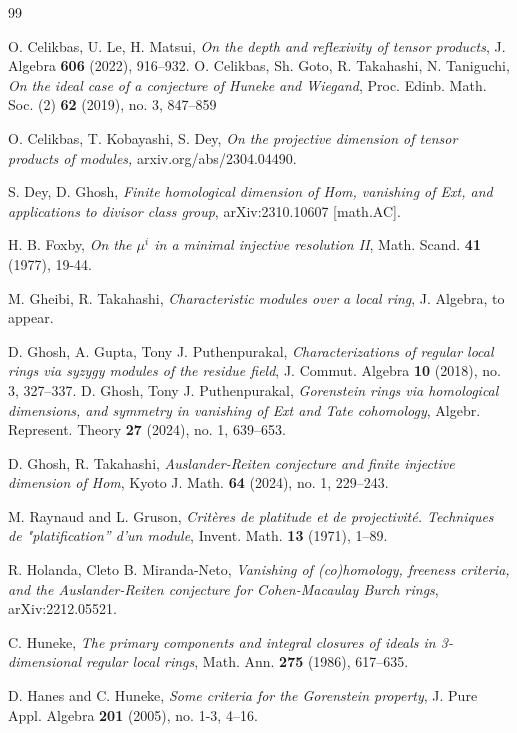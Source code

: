 \documentclass[10. pt,a4paper]{amsart}
\theoremstyle{definition}
\theoremstyle{remark}
\begin{document}
\begin{thebibliography}{99}
 
O.  Celikbas, U. Le, H. Matsui,  \emph{On the depth and reflexivity of tensor products}, J. Algebra  {\bf606} (2022), 916–932.
O. 
Celikbas, Sh. Goto, R. Takahashi, N. Taniguchi, {\it On the ideal case of a conjecture of Huneke and Wiegand}, Proc. Edinb. Math. Soc. (2) {\bf62} (2019), no. 3, 847–859

O. Celikbas, T. Kobayashi, S. Dey, {\it On the projective dimension of tensor products of modules,} arxiv.org/abs/2304.04490.


S. Dey, D. Ghosh, {\it
Finite homological dimension of Hom, vanishing of Ext, and applications to divisor class group},
arXiv:2310.10607 [math.AC].


H. B. Foxby, {\it On the $\mu^i$ in a minimal injective resolution II}, Math. Scand.
{\bf41} (1977), 19-44.

M. Gheibi, R. Takahashi,
{\it   Characteristic modules over a local ring},
J.  Algebra,  to appear.

D. Ghosh, A. Gupta, Tony J. Puthenpurakal,
{\it   Characterizations of regular local rings via syzygy modules of the residue field},
J. Commut. Algebra {\bf10} (2018), no. 3, 327–337.
 D. Ghosh, Tony J. Puthenpurakal,
{\it Gorenstein rings via homological dimensions, and symmetry in vanishing of Ext and Tate cohomology},  Algebr. Represent. Theory {\bf27} (2024), no. 1, 639–653.

D. Ghosh, R. Takahashi, {\it
	Auslander-Reiten conjecture and finite injective dimension of Hom}, 
Kyoto J. Math. {\bf64} (2024), no. 1, 229--243.







M. 	Raynaud and L. Gruson,  \emph{Critères  de platitude et de projectivité. Techniques de "platification'' d'un module}, Invent. Math.  {\bf{13}} (1971), 1–89.

R. Holanda, Cleto B. Miranda-Neto,
\emph{Vanishing of (co)homology, freeness criteria, and the Auslander-Reiten conjecture for Cohen-Macaulay Burch rings}, arXiv:2212.05521. 


 C. Huneke, \emph{
 	The primary components and integral closures of ideals in 3-dimensional regular local rings}, Math. Ann.  {\bf{275}} (1986), 617--635.


D.
Hanes and C. Huneke, \emph{Some criteria for the Gorenstein property}, 
J. Pure Appl. Algebra {\bf{201}} (2005), no. 1-3, 4--16.


\end{thebibliography}
\end{document}
